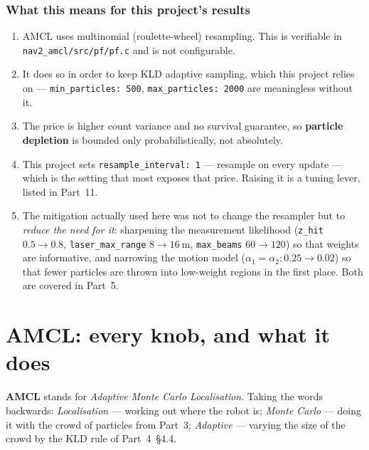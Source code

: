 \documentclass[11pt,a4paper]{report}
\newcommand{\term}[1]{\textcolor{rust}{\textbf{#1}}}
\newcommand{\file}[1]{\texttt{\small #1}}
\begin{document}
\subsection{What this means for this project's results}

\begin{plain}
\begin{enumerate}[leftmargin=1.6em,itemsep=3pt]
\item AMCL uses multinomial (roulette-wheel) resampling. This is verifiable in
\file{nav2\_amcl/src/pf/pf.c} and is not configurable.
\item It does so in order to keep KLD adaptive sampling, which this project
relies on --- \file{min\_particles: 500}, \file{max\_particles: 2000} are
meaningless without it.
\item The price is higher count variance and no survival guarantee, so
\term{particle depletion} is bounded only probabilistically, not absolutely.
\item This project sets \file{resample\_interval: 1} --- resample on every
update --- which is the setting that most exposes that price. Raising it is a
tuning lever, listed in Part~11.
\item The mitigation actually used here was not to change the resampler but to
\emph{reduce the need for it}: sharpening the measurement likelihood
(\file{z\_hit} $0.5 \rightarrow 0.8$, \file{laser\_max\_range}
$8 \rightarrow \SI{16}{\metre}$, \file{max\_beams} $60 \rightarrow 120$) so
that weights are informative, and narrowing the motion model
($\alpha_1 = \alpha_2 : 0.25 \rightarrow 0.02$) so that fewer particles are
thrown into low-weight regions in the first place. Both are covered in Part~5.
\end{enumerate}
\end{plain}

\chapter{AMCL: every knob, and what it does}
\label{ch:amcl}

\term{AMCL} stands for \emph{Adaptive Monte Carlo Localisation}. Taking the
words backwards: \emph{Localisation} --- working out where the robot is;
\emph{Monte Carlo} --- doing it with the crowd of particles from Part~3;
\emph{Adaptive} --- varying the size of the crowd by the KLD rule of
Part~4~\S4.4.
\end{document}
